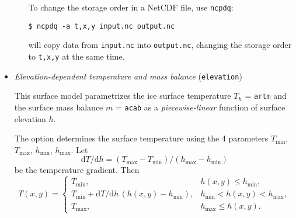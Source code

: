 \begin{itemize}
\begin{itemize}
To change the storage order in a NetCDF file, use \texttt{ncpdq}:
\begin{verbatim}
$ ncpdq -a t,x,y input.nc output.nc
\end{verbatim}%
will copy data from \texttt{input.nc} into \texttt{output.nc}, changing the storage order to \texttt{t,x,y} at the same time.
\end{itemize}

  \item \emph{Elevation-dependent temperature and mass balance} (\texttt{elevation})

   This surface model parametrizes the ice surface temperature $T_{h}$ = \texttt{artm} and the surface mass balance $m$ = \texttt{acab} as a \emph{piecewise-linear} function of surface elevation $h$.

    The option  determines the surface temperature using the 4 parameters $T_{\mathrm{min}}$, $T_{\mathrm{max}}$, $h_{\mathrm{min}}$, $h_{\mathrm{max}}$. Let
    \begin{equation}
      \mathrm{d}T/\mathrm{d}h = (T_{\text{max}} - T_{\text{min}}) / (h_{\text{max}} - h_{\text{min}})
    \end{equation}
    be the temperature gradient.  Then
    \begin{equation}
      T(x,y) = \begin{cases}
        T_{\text{min}}, & h(x,y) \le h_{\text{min}}, \\
        T_{\text{min}} + \mathrm{d}T/\mathrm{d}h\,(h(x,y) - h_{\text{min}}),
        &  h_{\text{min}} < h(x,y) < h_{\text{max}}, \\
        T_{\text{max}}, & h_{\text{max}} \le h(x,y). \end{cases}
    \end{equation}
    

\end{itemize}

